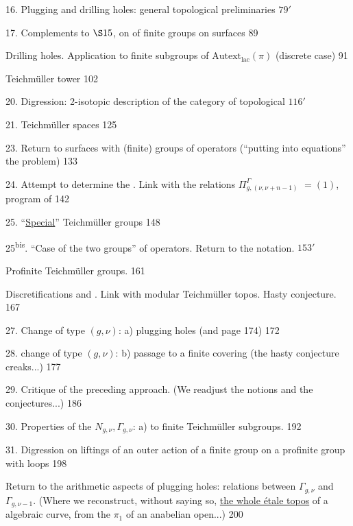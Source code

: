 16. Plugging and drilling holes: general topological preliminaries
\hfill \(79'\)

17. Complements to \(\S 15\), on  of finite groups
on surfaces \hfill 89

 Drilling holes. Application to finite
subgroups of \(\mathrm{Autext}_{\mathrm{lac}}(\pi)\)
(discrete case) \hfill 91

 Teichmüller tower \hfill 102

20. Digression: 2-isotopic description
of the category of topological  \hfill \(116'\)

21. Teichmüller spaces \hfill 125


23. Return to surfaces with (finite) groups of operators
(``putting into equations'' the problem) \hfill 133

24. Attempt to determine the . Link with the relations
\(\Pi_{g,(\nu,\nu+n-1)}^{\Gamma}\) \(=(1)\),
program of  \hfill 142

25. ``\uline{Special}'' Teichmüller groups \hfill 148

25\textsuperscript{bis}. ``Case of the two groups'' of operators. Return to the notation.
\hfill \(153'\)

 Profinite Teichmüller groups. \hfill 161

Discretifications and . Link with modular
Teichmüller topos. Hasty conjecture. \hfill 167

27. Change of type \((g,\nu)\): a) plugging holes
(and  page 174) \hfill 172

28. change of type \((g,\nu)\): b) passage to a finite covering
(the hasty conjecture creaks...) \hfill 177

29. Critique of the preceding approach. (We readjust
the notions and the conjectures...) \hfill 186

30. Properties of the \(N_{g,\nu},\Gamma_{g,\nu}\): a)
 to finite Teichmüller subgroups.
\hfill 192

31. Digression on liftings of an outer action of a finite
group on a profinite group with loops \hfill 198

 Return to the arithmetic aspects of plugging holes:
relations between \(\Gamma_{g,\nu}\) and \(\Gamma_{g,\nu-1}\).
(Where we reconstruct, without saying so, \uline{the whole étale topos} of a
 algebraic curve, from the \(\pi_1\) of an
anabelian open...) \hfill 200


